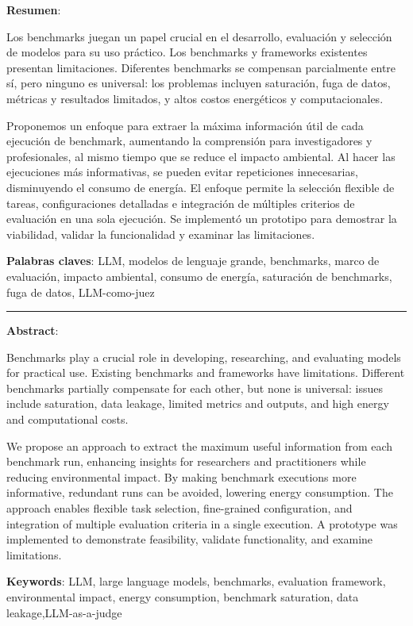 \textbf{Resumen}:

Los benchmarks juegan un papel crucial en el desarrollo, evaluación y selección de modelos para su uso práctico. Los benchmarks y frameworks existentes presentan limitaciones. Diferentes benchmarks se compensan parcialmente entre sí, pero ninguno es universal: los problemas incluyen saturación, fuga de datos, métricas y resultados limitados, y altos costos energéticos y computacionales.


Proponemos un enfoque para extraer la máxima información útil de cada ejecución de benchmark, aumentando la comprensión para investigadores y profesionales, al mismo tiempo que se reduce el impacto ambiental. Al hacer las ejecuciones más informativas, se pueden evitar repeticiones innecesarias, disminuyendo el consumo de energía. El enfoque permite la selección flexible de tareas, configuraciones detalladas e integración de múltiples criterios de evaluación en una sola ejecución. Se implementó un prototipo para demostrar la viabilidad, validar la funcionalidad y examinar las limitaciones.



\textbf{Palabras claves}: LLM, modelos de lenguaje grande, benchmarks, marco de evaluación, impacto ambiental, consumo de energía, saturación de benchmarks, fuga de datos, LLM-como-juez

\vspace{1cm}
\begin{center}
  \rule{0.5\textwidth}{.4pt}
\end{center}
\vspace{1cm}

\textbf{Abstract}:

Benchmarks play a crucial role in developing, researching, and evaluating models for practical use. Existing benchmarks and frameworks have limitations. Different benchmarks partially compensate for each other, but none is universal: issues include saturation, data leakage, limited metrics and outputs, and high energy and computational costs.



We propose an approach to extract the maximum useful information from each benchmark run, enhancing insights for researchers and practitioners while reducing environmental impact. By making benchmark executions more informative, redundant runs can be avoided, lowering energy consumption. The approach enables flexible task selection, fine-grained configuration, and integration of multiple evaluation criteria in a single execution. A prototype was implemented to demonstrate feasibility, validate functionality, and examine limitations.




\textbf{Keywords}: LLM, large language models, benchmarks, evaluation framework, environmental impact, energy consumption, benchmark saturation, data leakage,LLM-as-a-judge
